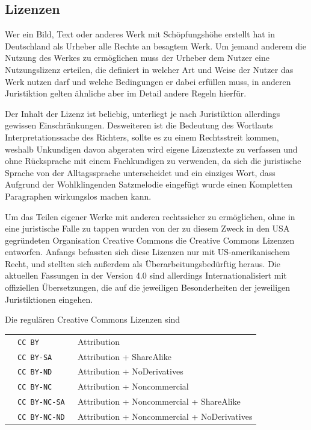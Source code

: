 \subsection{Lizenzen}

Wer ein Bild, Text oder anderes Werk mit Schöpfungshöhe erstellt hat in
Deutschland als Urheber alle Rechte an besagtem Werk. Um jemand anderem die
Nutzung des Werkes zu ermöglichen muss der Urheber dem Nutzer eine
Nutzungslizenz erteilen, die definiert in welcher Art und Weise der Nutzer das
Werk nutzen darf und welche Bedingungen er dabei erfüllen muss, in anderen
Juristiktion gelten ähnliche aber im Detail andere Regeln hierfür.

Der Inhalt der Lizenz ist beliebig, unterliegt je nach Juristiktion allerdings
gewissen Einschränkungen. Desweiteren ist die Bedeutung des Wortlauts
Interpretationssache des Richters, sollte es zu einem Rechtsstreit kommen,
weshalb Unkundigen davon abgeraten wird eigene Lizenztexte zu verfassen und ohne
Rücksprache mit einem Fachkundigen zu verwenden, da sich die juristische Sprache
von der Alltagssprache unterscheidet und ein einziges Wort, dass Aufgrund der
Wohlklingenden Satzmelodie eingefügt wurde einen Kompletten Paragraphen
wirkungslos machen kann.

Um das Teilen eigener Werke mit anderen rechtssicher zu ermöglichen, ohne in
eine juristische Falle zu tappen wurden von der zu diesem Zweck in den USA
gegründeten Organisation Creative Commons die Creative Commons Lizenzen
entworfen. Anfangs befassten sich diese Lizenzen nur mit US-amerikanischem
Recht, und stellten sich außerdem als Überarbeitungsbedürftig heraus. Die
aktuellen Fassungen in der Version 4.0 sind allerdings Internationalisiert mit
offiziellen Übersetzungen, die auf die jeweiligen Besonderheiten der jeweiligen
Juristiktionen eingehen. \cite{CC}

Die regulären Creative Commons Lizenzen sind

\begin{tabular}{ c l l }
  & \texttt{CC BY \cite{CC-BY}} & Attribution \\
  & \texttt{CC BY-SA \cite{CC-BY-SA}} & Attribution + ShareAlike \\
  & \texttt{CC BY-ND \cite{CC-BY-ND}} & Attribution + NoDerivatives \\
  & \texttt{CC BY-NC \cite{CC-BY-NC}} & Attribution + Noncommercial \\
  & \texttt{CC BY-NC-SA \cite{CC-BY-NC-SA}} & Attribution + Noncommercial + ShareAlike \\
  & \texttt{CC BY-NC-ND \cite{CC-BY-NC-ND}} &  Attribution + Noncommercial + NoDerivatives
\end{tabular}

